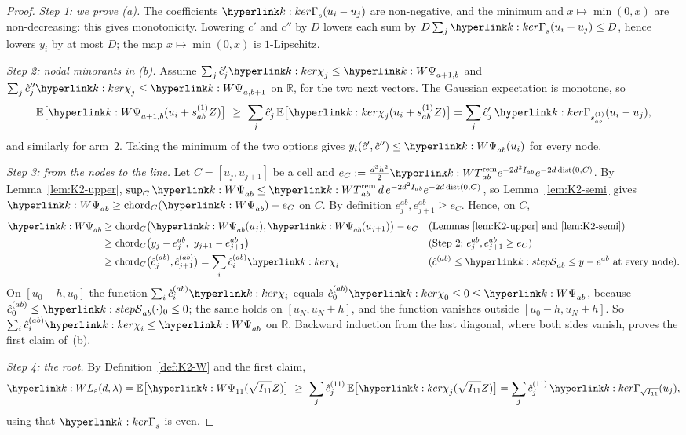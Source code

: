\documentclass[11pt]{article}
\newcommand{\R}{\mathbb{R}}
\newcommand{\E}{\mathbb{E}}
\newcommand{\1}{\mathbf{1}}
\begin{document}
\begin{proof}
\textit{Step 1: we prove (a).} The coefficients $\kGam_s(u_i-u_j)$ are non-negative, and the minimum and $x\mapsto\min(0,x)$ are non-decreasing: this gives monotonicity.
Lowering $c'$ and $c''$ by $D$ lowers each sum by $D\sum_j\kGam_s(u_i-u_j)\le D$, hence lowers $y_i$ by at most $D$; the map $x\mapsto\min(0,x)$ is $1$-Lipschitz.

\textit{Step 2: nodal minorants in (b).} Assume $\sum_j\hat c'_j\kchi_j\le\kW_{a+1,b}$ and $\sum_j\hat c''_j\kchi_j\le\kW_{a,b+1}$ on $\R$, for the two next vectors. The
Gaussian expectation is monotone, so
\[
\E\big[\kW_{a+1,b}(u_i+s^{(1)}_{ab}Z)\big]\ \ge\ \sum_j\hat c'_j\,\E\big[\kchi_j(u_i+s^{(1)}_{ab}Z)\big]=\sum_j\hat c'_j\,\kGam_{s^{(1)}_{ab}}(u_i-u_j),
\]
and similarly for arm~$2$. Taking the minimum of the two options gives $y_i(\hat c',\hat c'')\le\kW_{ab}(u_i)$ for every node.

\textit{Step 3: from the nodes to the line.} Let $C=[u_j,u_{j+1}]$ be a cell and $e_C:=\frac{d^3h^2}2\kT_{ab}e^{-2d^2I_{ab}}e^{-2d\,\mathrm{dist}(0,C)}$. By
Lemma~\ref{lem:K2-upper}, $\sup_C\kW_{ab}\le\kT_{ab}\,d\,e^{-2d^2I_{ab}}e^{-2d\,\mathrm{dist}(0,C)}$, so Lemma~\ref{lem:K2-semi} gives $\kW_{ab}\ge\text{chord}_C(\kW_{ab})-e_C$ on
$C$. By definition $e^{ab}_j,e^{ab}_{j+1}\ge e_C$. Hence, on $C$,
\begin{align*}
\kW_{ab}&\ge\text{chord}_C\big(\kW_{ab}(u_j),\kW_{ab}(u_{j+1})\big)-e_C && \text{(Lemmas~\ref{lem:K2-upper} and~\ref{lem:K2-semi})}\\
&\ge\text{chord}_C\big(y_j-e^{ab}_j,\ y_{j+1}-e^{ab}_{j+1}\big) && \text{(Step~2; $e^{ab}_j,e^{ab}_{j+1}\ge e_C$)}\\
&\ge\text{chord}_C\big(\hat c^{(ab)}_j,\hat c^{(ab)}_{j+1}\big)=\sum_i\hat c^{(ab)}_i\kchi_i && \text{($\hat c^{(ab)}\le\kS_{ab}\le y-e^{ab}$ at every node)}.
\end{align*}
On $[u_0-h,u_0]$ the function $\sum_i\hat c^{(ab)}_i\kchi_i$ equals $\hat c^{(ab)}_0\kchi_0\le0\le\kW_{ab}$, because $\hat c^{(ab)}_0\le\kS_{ab}(\cdot)_0\le0$; the same holds on
$[u_N,u_N+h]$, and the function vanishes outside $[u_0-h,u_N+h]$. So $\sum_i\hat c^{(ab)}_i\kchi_i\le\kW_{ab}$ on $\R$. Backward induction from the last diagonal, where both
sides vanish, proves the first claim of~(b).

\textit{Step 4: the root.} By Definition~\ref{def:K2-W} and the first claim,
\[
\kL(d,\lambda)=\E\big[\kW_{11}(\sqrt{I_{11}}Z)\big]\ \ge\ \sum_j\hat c^{(11)}_j\,\E\big[\kchi_j(\sqrt{I_{11}}Z)\big]=\sum_j\hat c^{(11)}_j\,\kGam_{\sqrt{I_{11}}}(u_j),
\]
using that $\kGam_s$ is even.
\end{proof}
\end{document}
